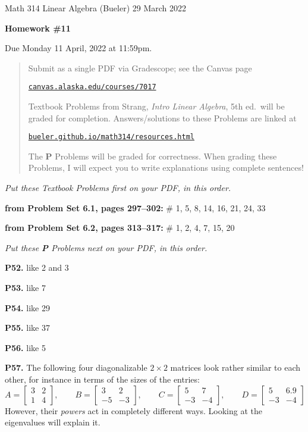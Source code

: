 \documentclass[12pt]{amsart}
\newcommand{\prob}[1]{\bigskip\noindent\textbf{#1.}\quad }
\newcommand{\probset}[2]{\bigskip\noindent\textbf{from Problem Set #1, pages #2:}\quad }
\begin{document}
\scriptsize \noindent Math 314 Linear Algebra (Bueler) \hfill 29 March 2022
\normalsize\medskip

\Large
\centerline{\textbf{Homework \#11}}

\bigskip
\large
\centerline{Due Monday 11 April, 2022 at 11:59pm.}

\normalsize
\bigskip
\begin{quote}
\medskip
\noindent Submit as a single PDF via Gradescope; see the Canvas page

\href{https://canvas.alaska.edu/courses/7017}{\texttt{canvas.alaska.edu/courses/7017}}

\noindent Textbook Problems from Strang, \emph{Intro Linear Algebra}, 5th ed.~will be graded for completion.  Answers/solutions to these Problems are linked at

\href{https://bueler.github.io/math314/resources.html}{\texttt{bueler.github.io/math314/resources.html}}

\noindent The \textbf{P} Problems will be graded for correctness.  When grading these Problems, I will expect you to write explanations using complete sentences!
\end{quote}
\medskip

\thispagestyle{empty}

\noindent \hrulefill

\noindent \emph{Put these Textbook Problems first on your PDF, in this order.}

\probset{6.1}{297--302} \# 1, 5, 8, 14, 16, 21, 24, 33

\probset{6.2}{313--317} \# 1, 2, 4, 7, 15, 20

\bigskip
\noindent \hrulefill

\noindent \emph{Put these \textbf{P} Problems next on your PDF, in this order.}

\prob{P52}  6.1 like 2 and 3

\prob{P53}  like 7

\prob{P54}  like 29

\prob{P55}  like 37

\prob{P56}  6.2 like 5


\prob{P57}  The following four diagonalizable $2\times 2$ matrices look rather similar to each other, for instance in terms of the sizes of the entries:
    $$A = \begin{bmatrix} 3 & 2 \\ 1 & 4 \end{bmatrix}, \qquad B = \begin{bmatrix} 3 & 2 \\ -5 & -3 \end{bmatrix}, \qquad C = \begin{bmatrix} 5 & 7 \\ -3 & -4 \end{bmatrix}, \qquad D = \begin{bmatrix} 5 & 6.9 \\ -3 & -4 \end{bmatrix}$$
However, their \emph{powers} act in completely different ways.  Looking at the eigenvalues will explain it.
\end{document}
